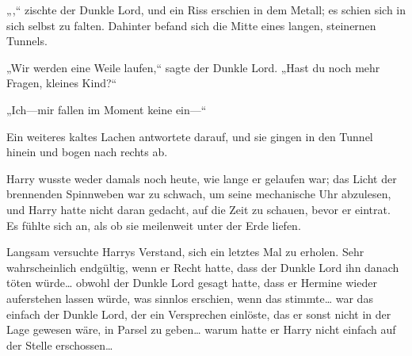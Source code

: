 „,“ zischte der Dunkle Lord, und ein Riss erschien in dem Metall; es schien sich in sich selbst zu falten. Dahinter befand sich die Mitte eines langen, steinernen Tunnels.


„Wir werden eine Weile laufen,“ sagte der Dunkle Lord. „Hast du noch mehr Fragen, kleines Kind?“

„Ich—mir fallen im Moment keine ein—“

Ein weiteres kaltes Lachen antwortete darauf, und sie gingen in den Tunnel hinein und bogen nach rechts ab.

Harry wusste weder damals noch heute, wie lange er gelaufen war; das Licht der brennenden Spinnweben war zu schwach, um seine mechanische Uhr abzulesen, und Harry hatte nicht daran gedacht, auf die Zeit zu schauen, bevor er eintrat. Es fühlte sich an, als ob sie meilenweit unter der Erde liefen.

Langsam versuchte Harrys Verstand, sich ein letztes Mal zu erholen.
Sehr wahrscheinlich endgültig, wenn er Recht hatte, dass der Dunkle Lord ihn danach töten würde… obwohl der Dunkle Lord gesagt hatte, dass er Hermine wieder auferstehen lassen würde, was sinnlos erschien, wenn das stimmte… war das einfach der Dunkle Lord, der ein Versprechen einlöste, das er sonst nicht in der Lage gewesen wäre, in Parsel zu geben… warum hatte er Harry nicht einfach auf der Stelle erschossen…

